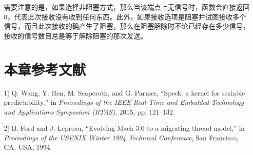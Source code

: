 需要注意的是，如果选择非阻塞方式，那么当该端点上无信号时，函数会直接返回0，代表此次接收没有收到任何东西。此外，如果接收选项是阻塞并试图接收多个信号，而且此次接收的确产生了阻塞，那么在阻塞解除时不论已经存在多少信号，接收的信号数目总是等于解除阻塞的那次发送。

\section{本章参考文献}\label{sec:5-references}

\protect{}\label{cite:5-1}

\noindent {[}1{]} Q. Wang, Y. Ren, M. Scaperoth, and G. Parmer, ``Speck: a kernel for scalable predictability,'' in \textit{Proceedings of the IEEE Real-Time and Embedded Technology and Applications Symposium (RTAS)}, 2015, pp. 121--132.

\protect{}\label{cite:5-2}

\noindent {[}2{]} B. Ford and J. Lepreau, ``Evolving Mach 3.0 to a migrating thread model,'' in \textit{Proceedings of the USENIX Winter 1994 Technical Conference}, San Francisco, CA, USA, 1994.

